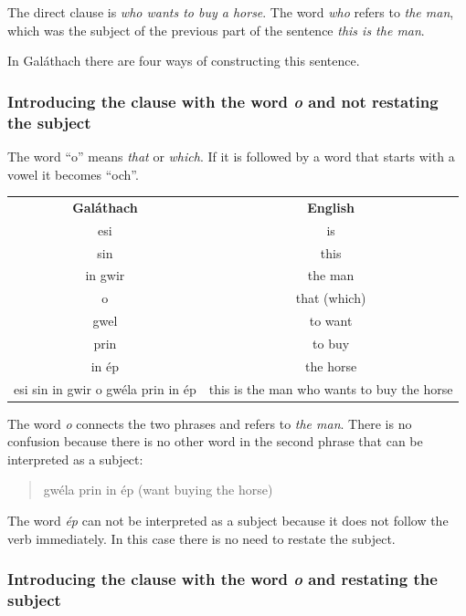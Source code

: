 The direct clause is \textit{who wants to buy a horse}. The word \textit{who} refers to \textit{the man}, which was the subject of the previous part of the sentence \textit{this is the man}.

In Gal\'{a}thach there are four ways of constructing this sentence.

\subsubsection{Introducing the clause with the word \textit{o} and not restating the subject}

The word ``o'' means \textit{that} or \textit{which}. If it is followed by a word that starts with a vowel it becomes ``och''.

\begin{table}[H]
\centering
\begin{tabular}{cc}
  \toprule
  \textbf{Gal\'{a}thach} & \textbf{English}\\
  \cmidrule(lr){1-1}\cmidrule(lr){2-2}
  esi & is\\
  sin & this\\
  in gwir & the man\\
  o & that (which)\\
  gwel & to want\\
  prin & to buy\\
  in \'{e}p & the horse\\
  esi sin in gwir o gw\'{e}la prin in \'{e}p & this is the man who wants to buy the horse\\
  \bottomrule
\end{tabular}
\label{examples_way1}
\end{table}

The word \textit{o} connects the two phrases and refers to \textit{the man}. There is no confusion because there is no other word in the second phrase that can be interpreted as a subject:

\begin{quote}
gw\'{e}la prin in \'{e}p (want buying the horse)
\end{quote}

The word \textit{\'{e}p} can not be interpreted as a subject because it does not follow the verb immediately. In this case there is no need to restate the subject.

\subsubsection{Introducing the clause with the word \textit{o} and restating the subject}

